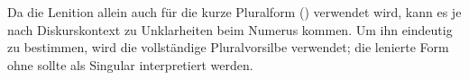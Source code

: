 \subsubsection{} Da die Lenition allein auch für die kurze Pluralform () verwendet wird, kann es je nach Diskurskontext zu Unklarheiten beim Numerus kommen. Um ihn eindeutig zu bestimmen, wird die vollständige Pluralvorsilbe  verwendet; die lenierte Form ohne  sollte als Singular interpretiert werden.
\label{syn:adp:short-plural}


%
%
%
%
%
